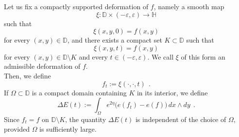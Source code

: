 \documentclass[a4paper,11pt,openright,twoside]{book}
\renewcommand{\epsilon}{\varepsilon}
\renewcommand{\Omega}{\varOmega}
\newcommand{\1}{\mathds{1}}
\theoremstyle{plain}
\theoremstyle{definition}
\theoremstyle{remark}
\begin{document}
Let us fix a compactly supported deformation of $f$, namely a smooth map
\[
\xi:\mathbb{D}\times (-\epsilon,\epsilon) \to \mathbb{H}
\]
such that
\[
\xi(x,y,0) = f(x,y)
\]
for every $(x,y)\in\mathbb{D}$, and there exists a compact set $K\subset \mathbb{D}$ such that
\[
\xi(x,y,t)=f(x,y)
\]
for every $(x,y)\in \mathbb{D}\setminus K$ and every $t\in (-\epsilon,\epsilon)$. We call $\xi$ of this form an admissible deformation of $f$. \\
Then, we define
\[
f_t := \xi(\cdot,\cdot,t)
\ \ .
\]
If $\Omega\subset \mathbb{D}$ is a compact domain containing $K$ in its interior, we define
\[
\Delta E(t):=\int_\Omega e^{2\eta}\bigl(e(f_t)-e(f)\bigr)\,dx\wedge dy
\ \ .
\]
Since $f_t=f$ on $\mathbb{D}\setminus K$, the quantity $\Delta E(t)$ is independent of the choice of $\Omega$, provided $\Omega$ is sufficiently large.
\end{document}
